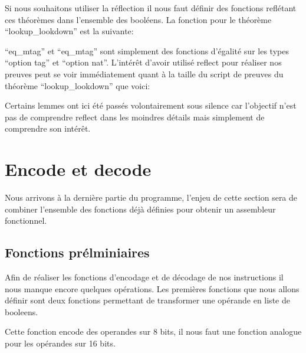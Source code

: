 \documentclass {article}
\newcommand{\codefrom}[3]
           {}
\theoremstyle{definition}
\theoremstyle{remark}
\begin{document}
\codefrom{src}{association_list}{lookup_lookdown}
\codefrom{src}{association_list}{lookdown_lookup}


Si nous souhaitons utiliser la réflection il nous faut définir des fonctions reflétant
ces théorèmes dans l'ensemble des booléens. La fonction pour le théorème ``lookup\_lookdown''
est la suivante:

\codefrom{src}{association_list}{lookup_encdec}
``eq\_mtag'' et ``eq\_mtag'' sont simplement des fonctions d'égalité sur les types ``option tag'' et ``option nat''.
L'intérêt d'avoir utilisé reflect pour réaliser nos preuves peut se voir immédiatement quant à la taille
du script de preuves du théorème ``lookup\_lookdown'' que voici:

\codefrom{src}{association_list}{lookup_lookdown}

\codefrom{src}{association_list}{lookup_lookdown_script}

Certains lemmes ont ici été passés volontairement sous silence car l'objectif n'est pas
de comprendre reflect dans les moindres détails mais simplement de comprendre son intérêt.



\section{Encode et decode}
\label{Encode Decode}

Nous arrivons à la dernière partie du programme, l'enjeu de cette section sera de combiner l'ensemble des fonctions
déjà définies pour obtenir un assembleur fonctionnel.

\subsection{Fonctions prélminiaires}

Afin de réaliser les fonctions d'encodage et de décodage de nos instructions il nous manque encore quelques opérations.
Les premières fonctions que nous allons définir sont deux fonctions permettant de transformer une opérande en liste de booleens.

\codefrom{src}{encode}{operand_to_bin}

Cette fonction encode des operandes sur 8 bits, il nous faut une fonction analogue pour les opérandes sur 16 bits.

\codefrom{src}{encode}{operand_to_bin_double}
\end{document}
